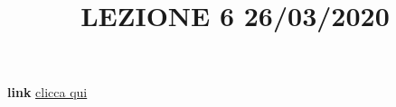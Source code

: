 \title{LEZIONE 6 26/03/2020}\newline
\textbf{link} \href{https://web.microsoftstream.com/video/c4d111d7-4825-4513-afe0-f0fd323398dd}{clicca qui}
\section{}